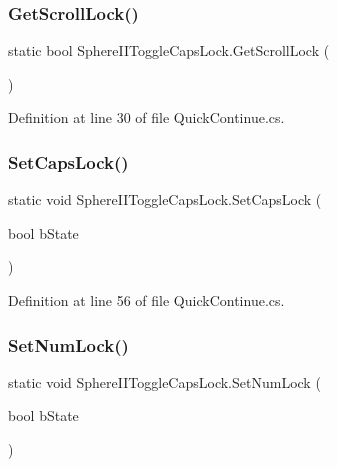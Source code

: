 \subsubsection{\texorpdfstring{GetScrollLock()}{GetScrollLock()}}
{\footnotesize\ttfamily static bool Sphere\+I\+I\+Toggle\+Caps\+Lock.\+Get\+Scroll\+Lock (\begin{DoxyParamCaption}{ }\end{DoxyParamCaption})\hspace{0.3cm}{\ttfamily [static]}}



Definition at line 30 of file Quick\+Continue.\+cs.

\mbox{\label{class_sphere_i_i_toggle_caps_lock_a2a6a8e77a1901b4a6358dee035f67b9a}} 
\subsubsection{\texorpdfstring{SetCapsLock()}{SetCapsLock()}}
{\footnotesize\ttfamily static void Sphere\+I\+I\+Toggle\+Caps\+Lock.\+Set\+Caps\+Lock (\begin{DoxyParamCaption}\item[{bool}]{b\+State }\end{DoxyParamCaption})\hspace{0.3cm}{\ttfamily [static]}}



Definition at line 56 of file Quick\+Continue.\+cs.

\mbox{\label{class_sphere_i_i_toggle_caps_lock_a2cf9b477dbc8503b11958438fa9cc69d}} 
\subsubsection{\texorpdfstring{SetNumLock()}{SetNumLock()}}
{\footnotesize\ttfamily static void Sphere\+I\+I\+Toggle\+Caps\+Lock.\+Set\+Num\+Lock (\begin{DoxyParamCaption}\item[{bool}]{b\+State }\end{DoxyParamCaption})\hspace{0.3cm}{\ttfamily [static]}}




